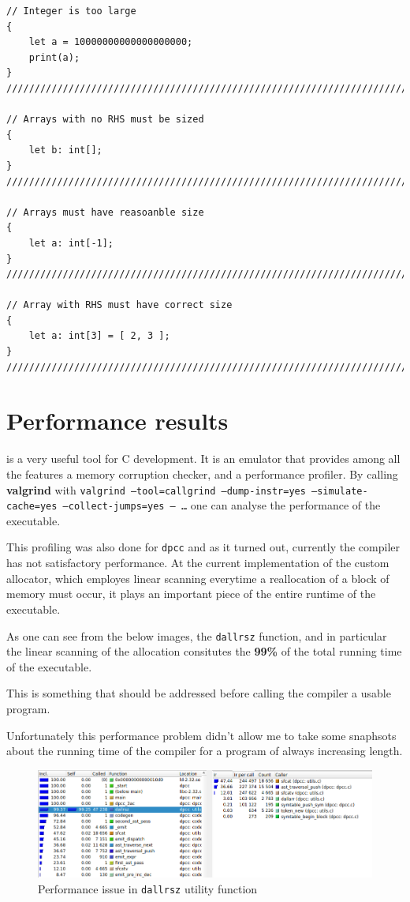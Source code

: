 \documentclass[a4paper]{article}
\newcommand{\urlref}[3][blue]{\href{#2}{\color{#1}{#3}}}%
\begin{document}
\begin{lstlisting}[language=DPL]
// Integer is too large
{
    let a = 10000000000000000000;
    print(a);
}
///////////////////////////////////////////////////////////////////////////////

// Arrays with no RHS must be sized
{
    let b: int[];
}
///////////////////////////////////////////////////////////////////////////////

// Arrays must have reasoanble size
{
    let a: int[-1];
}
///////////////////////////////////////////////////////////////////////////////

// Array with RHS must have correct size
{
    let a: int[3] = [ 2, 3 ];
}
///////////////////////////////////////////////////////////////////////////////
\end{lstlisting}


\section{Performance results}

\urlref{https://www.valgrind.org/}{Valgrind} is a very useful tool for C development. It is an emulator that provides among
all the features a memory corruption checker, and a performance profiler. By calling \textbf{valgrind} with
\texttt{valgrind --tool=callgrind --dump-instr=yes --simulate-cache=yes --collect-jumps=yes -- \dots} one can analyse
the performance of the executable.

This profiling was also done for \texttt{dpcc} and as it turned out, currently the compiler has not satisfactory performance.
At the current implementation of the custom allocator, which employes linear scanning everytime a reallocation of a block
of memory must occur, it plays an important piece of the entire runtime of the executable.

As one can see from the below images, the \texttt{dallrsz} function, and in particular the linear scanning of the allocation
consitutes the \textbf{99\%} of the total running time of the executable.

This is something that should be addressed before calling the compiler a usable program.

Unfortunately this performance problem didn't allow me to take some snaphsots about the running time of the compiler
for a program of always increasing length.

\begin{figure}[H]
    \centering
    \includegraphics[width=\linewidth]{imgs/dallrsz_performance_issue.png}
    \caption{Performance issue in \texttt{dallrsz} utility function}
\end{figure}
\end{document}
